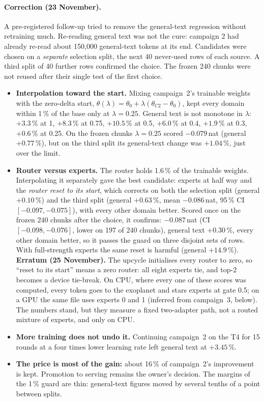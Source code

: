\documentclass[11pt,a4paper]{article}
\begin{document}
\paragraph{Correction (23 November).} A pre-registered follow-up tried to remove the general-text regression without
retraining much. Re-reading general text was not the cure: campaign 2 had already re-read about 150{,}000 general-text
tokens at its end. Candidates were chosen on a \emph{separate} selection split, the next 40 never-used rows of each
source. A third split of 40 further rows confirmed the choice. The frozen 240 chunks were not reused after their single
test of the first choice.
\begin{itemize}[leftmargin=*,itemsep=2pt]
  \item \textbf{Interpolation toward the start.} Mixing campaign~2's trainable weights with the zero-delta start,
    $\theta(\lambda)=\theta_0+\lambda(\theta_{C2}-\theta_0)$, kept every domain within 1\,\% of the base only at
    $\lambda=0.25$. General text is not monotone in $\lambda$: $+3.3\,\%$ at 1, $+8.3\,\%$ at 0.75, $+10.5\,\%$ at 0.5,
    $+6.0\,\%$ at 0.4, $+1.9\,\%$ at 0.3, $+0.6\,\%$ at 0.25. On the frozen chunks $\lambda=0.25$ scored $-0.079$\,nat
    (general $+0.77\,\%$), but on the third split its general-text change was $+1.04\,\%$, just over the limit.
  \item \textbf{Router versus experts.} The router holds 1.6\,\% of the trainable weights. Interpolating it separately
    gave the best candidate: experts at half way and the \emph{router reset to its start}, which corrects on both the
    selection split (general $+0.10\,\%$) and the third split (general $+0.63\,\%$, mean $-0.086$\,nat, 95\,\% CI
    $[-0.097,-0.075]$), with every other domain better. Scored once on the frozen 240 chunks after the choice, it
    confirms: $-0.087$\,nat (CI $[-0.098,-0.076]$, lower on 197 of 240 chunks), general text $+0.30\,\%$, every other
    domain better, so it passes the guard on three disjoint sets of rows. With full-strength experts the same reset is
    harmful (general $+14.9\,\%$).
    \textbf{Erratum (25 November).} The upcycle initialises every router to zero, so ``reset to its start'' means a
    zero router: all eight experts tie, and top-2 becomes a device tie-break. On CPU, where every one of these scores was
    computed, every token goes to the exoplanet and stars experts at gate 0.5; on a GPU the same file uses experts 0 and 1
    (inferred from campaign~3, below). The numbers stand, but they measure a fixed two-adapter path, not a routed mixture
    of experts, and only on CPU.
  \item \textbf{More training does not undo it.} Continuing campaign~2 on the T4 for 15 rounds at a four times lower
    learning rate left general text at $+3.45\,\%$.
  \item \textbf{The price is most of the gain:} about 16\,\% of campaign~2's improvement is kept. Promotion to serving
    remains the owner's decision. The margins of the 1\,\% guard are thin: general-text figures moved by several tenths of
    a point between splits.
\end{itemize}
\end{document}
